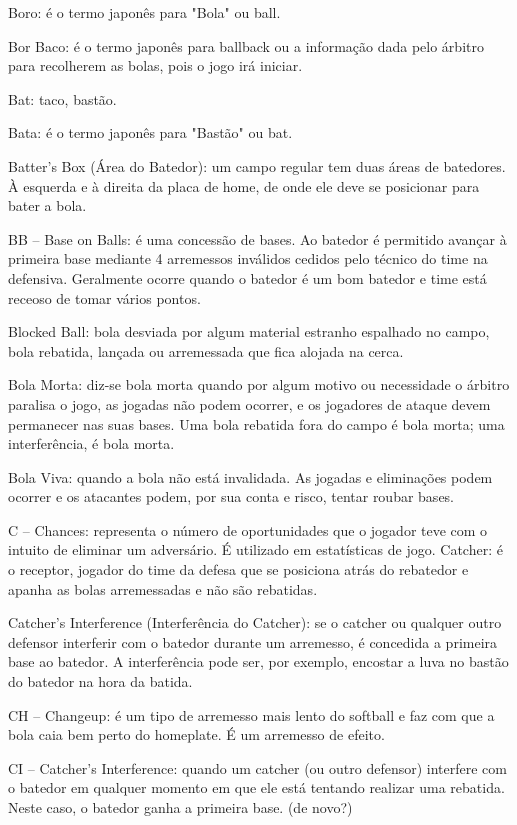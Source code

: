  Boro: é o termo japonês para "Bola" ou \gls{ball}.

 Bor Baco: é o termo japonês para \gls{ballback} ou a informação dada pelo árbitro para recolherem as bolas, pois o jogo irá iniciar.

 Bat: taco, bastão.

 Bata: é o termo japonês para "Bastão" ou \gls{bat}.

 Batter's Box (Área do Batedor): um campo regular tem duas áreas de batedores. À esquerda e à direita da placa de home, de onde ele deve se posicionar para bater a bola.

 BB -- Base on Balls: é uma concessão de bases. Ao batedor é permitido avançar à primeira base mediante 4 arremessos inválidos cedidos pelo técnico do time na defensiva. Geralmente ocorre quando o batedor é um bom batedor e time está receoso de tomar vários pontos.

 Blocked Ball: bola desviada por algum material estranho espalhado no campo, bola rebatida, lançada ou arremessada que fica alojada na cerca.

 Bola Morta: diz-se bola morta quando por algum motivo ou necessidade o árbitro paralisa o jogo, as jogadas não podem ocorrer, e os jogadores de ataque devem permanecer nas suas bases. Uma bola rebatida fora do campo é bola morta; uma interferência, é bola morta.

 Bola Viva: quando a bola não está invalidada. As jogadas e eliminações podem ocorrer e os atacantes podem, por sua conta e risco, tentar roubar bases.

 C -- Chances: representa o número de oportunidades que o jogador teve com o intuito de eliminar um adversário. É utilizado em estatísticas de jogo.
 Catcher: é o receptor, jogador do time da defesa que se posiciona atrás do rebatedor e apanha as bolas arremessadas e não são rebatidas.

 Catcher's Interference (Interferência do Catcher): se o catcher ou qualquer outro defensor interferir com o batedor durante um arremesso, é concedida a primeira base ao batedor. A interferência pode ser, por exemplo, encostar a luva no bastão do batedor na hora da batida.

 CH -- Changeup: é um tipo de arremesso mais lento do softball e faz com que a bola caia bem perto do \gls{homeplate}. É um arremesso de efeito.

 CI -- Catcher's Interference: quando um catcher (ou outro defensor) interfere com o batedor em qualquer momento em que ele está tentando realizar uma
 rebatida. Neste caso, o batedor ganha a primeira base. (de novo?)

